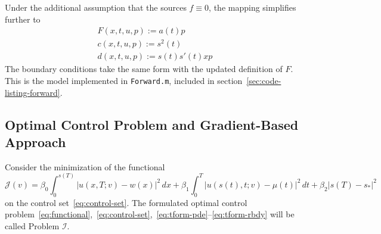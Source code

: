 \documentclass[letterpaper, 10pt]{amsart}
\theoremstyle{definition}
\theoremstyle{remark}
\newcommand{\lnorm}[1]{\left\vert #1\right\vert}%
\begin{document}
Under the additional assumption that the sources $f \equiv 0$, the mapping simplifies further to
\begin{gather*}
  F(x, t, u, p) := a(t) p
  \\
  c(x,t,u,p) := s^2(t)
  \\
  d(x,t,u,p) := s(t) s'(t) x p
\end{gather*}
The boundary conditions take the same form with the updated definition of $F$.
This is the model implemented in \verb+Forward.m+, included in section~\ref{sec:code-listing-forward}.

\subsection{Optimal Control Problem and Gradient-Based Approach}\label{sec:statement-of-main-results}
Consider the minimization of the functional
\def\J{\mathcal{J}}
\begin{equation}
  \J(v)
  = \beta_0 \int_0^{s(T)} \lnorm{u(x, T; v) - w(x)}^2\,dx
  + \beta_1 \int_0^T \lnorm{u(s(t), t; v) - \mu(t)}^2\,dt
  + \beta_2 \lnorm{s(T) - s_*}^2\label{eq:functional}
\end{equation}
on the control set~\eqref{eq:control-set}.
\def\I{\mathcal{I}}
The formulated optimal control problem~\eqref{eq:functional},~\eqref{eq:control-set},~\eqref{eq:tform-pde}--\eqref{eq:tform-rbdy} will be called Problem $\I$.
\end{document}
